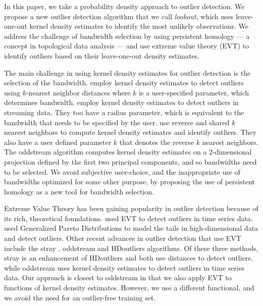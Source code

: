 \documentclass[11pt,a4paper,]{article}
\theoremstyle{definition}
\theoremstyle{definition}
\theoremstyle{definition}
\theoremstyle{remark}
\begin{document}
In this paper, we take a probability density approach to outlier detection. We propose a new outlier detection algorithm that we call \emph{lookout}, which uses leave-one-out kernel density estimates to identify the most unlikely observations. We address the challenge of bandwidth selection by using persistent homology --- a concept in topological data analysis --- and use extreme value theory (EVT) to identify outliers based on their leave-one-out density estimates.

The main challenge in using kernel density estimates for outlier detection is the selection of the bandwidth. \textcite{Schubert2014} employ kernel density estimates to detect outliers using \(k\)-nearest neighbor distances where \(k\) is a user-specified parameter, which determines bandwidth. \textcite{Qin2019} employ kernel density estimates to detect outliers in streaming data. They too have a radius parameter, which is equivalent to the bandwidth that needs to be specified by the user. \textcite{Tang2017} use reverse and shared \(k\) nearest neighbors to compute kernel density estimates and identify outliers. They also have a user defined parameter \(k\) that denotes the reverse \(k\) nearest neighbors. The oddstream algorithm \autocite{talagala2019anomaly} computes kernel density estimates on a 2-dimensional projection defined by the first two principal components, and so bandwidths need to be selected. We avoid subjective user-choice, and the inappropriate use of bandwidths optimized for some other purpose, by proposing the use of persistent homology as a new tool for bandwidth selection.

Extreme Value Theory has been gaining popularity in outlier detection because of its rich, theoretical foundations. \textcite{Burridge2006} used EVT to detect outliers in time series data. \textcite{Clifton2014} used Generalized Pareto Distributions to model the tails in high-dimensional data and detect outliers. Other recent advances in outlier detection that use EVT include the stray \autocite{stray}, oddstream \autocite{talagala2019anomaly} and HDoutliers \autocite{wilkinson2017visualizing} algorithms. Of these three methods, stray is an enhancement of HDoutliers and both use distances to detect outliers, while oddstream uses kernel density estimates to detect outliers in time series data. Our approach is closest to oddstream in that we also apply EVT to functions of kernel density estimates. However, we use a different functional, and we avoid the need for an outlier-free training set.
\end{document}
